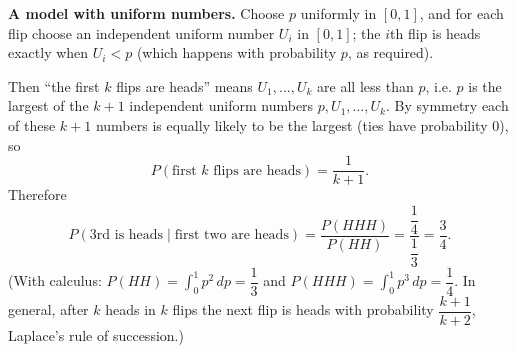 \textbf{A model with uniform numbers.} Choose $p$ uniformly in $[0,1]$, and for each flip choose an independent uniform number $U_i$ in $[0,1]$; the $i$th flip is heads exactly when $U_i<p$ (which happens with probability $p$, as required).

Then ``the first $k$ flips are heads'' means $U_1,\dots,U_k$ are all less than $p$, i.e. $p$ is the largest of the $k+1$ independent uniform numbers $p,U_1,\dots,U_k$. By symmetry each of these $k+1$ numbers is equally likely to be the largest (ties have probability $0$), so
\[P(\text{first }k\text{ flips are heads})=\dfrac1{k+1}.\]
Therefore
\[P(\text{3rd is heads}\mid\text{first two are heads})=\dfrac{P(HHH)}{P(HH)}=\dfrac{\dfrac14}{\dfrac13}=\boxed{\dfrac34}.\]
(With calculus: $P(HH)=\displaystyle\int_0^1p^2\,dp=\dfrac13$ and $P(HHH)=\displaystyle\int_0^1p^3\,dp=\dfrac14$. In general, after $k$ heads in $k$ flips the next flip is heads with probability $\dfrac{k+1}{k+2}$, Laplace's rule of succession.)
